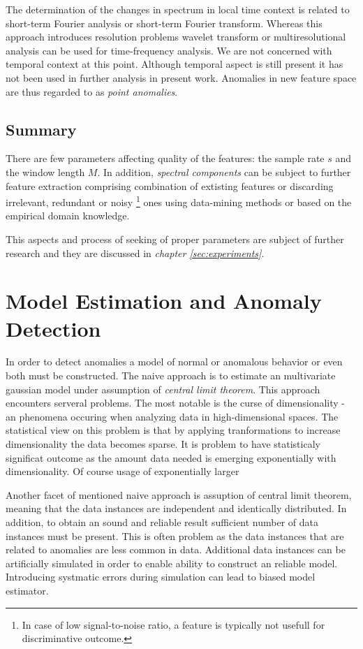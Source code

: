 The determination of the changes in spectrum in local time context is related to short-term
Fourier analysis or short-term Fourier transform. Whereas this approach introduces
resolution problems wavelet transform or multiresolutional analysis can be used for
time-frequency analysis. We are not concerned with temporal context at this point.
Although temporal aspect is still present it has not been used in further analysis 
in present work. Anomalies in new feature space are thus regarded to as \emph{point anomalies}. 

\subsection{Summary}

There are few parameters affecting quality of the  features: %
the sample rate $s$ and the window length $M$. 
In addition, \emph{spectral components} can be subject to further feature extraction 
comprising combination of extisting features or discarding irrelevant, 
redundant  or noisy%
\footnote{
    In case of low signal-to-noise ratio, a feature is typically not usefull 
    for discriminative outcome.
} %
ones using data-mining methods or based on the empirical domain knowledge.

This aspects and process of seeking of proper parameters are subject of further 
research and they are discussed in \emph{chapter \ref{sec:experiments}}.

\section{Model Estimation and Anomaly Detection}

In order to detect anomalies a model of normal or anomalous behavior or even both
must be constructed. The naive approach is to estimate an multivariate gaussian 
model under assumption of \emph{central limit theorem}. This approach encounters 
serveral problems. The most notable is the curse of dimensionality - 
an phenomena occuring when analyzing data in high-dimensional spaces.
The statistical view on this problem is that by applying tranformations 
to increase dimensionality the data becomes sparse. It is problem to 
have statisticaly significat outcome as the amount data needed is emerging
exponentially with dimensionality. Of course usage of exponentially larger

Another facet of mentioned naive approach is assuption of central limit theorem, 
meaning that the data instances are independent and identically distributed. 
In addition, to obtain an sound and reliable result sufficient number of data instances 
must be present. This is often problem as the data instances that are related to anomalies 
are less common in data. Additional data instances can be artificially simulated in order 
to enable ability to construct an reliable model. Introducing  systmatic errors during 
simulation can lead to biased model estimator. %


